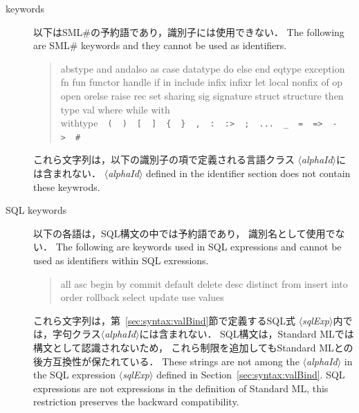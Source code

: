 \documentclass{jbook}
\newcommand{\txt}[2]{#2}
\newcommand{\smlsharp}{SML\#}
\newcommand{\nonterm}[1]{\mbox{$\langle$}{\it #1}\mbox{$\rangle$}}
\begin{document}
\begin{description}
\item[\txt{予約語}{keywords}] 
\ifjp%
	以下は\smlsharp{}の予約語であり，識別子には使用できない．
\else%
	The following are \smlsharp{} keywords and they cannot be used
as identifiers.
\fi%

\begin{tt}
\begin{quote}
abstype
and
andalso
as
case
datatype
do
else
end
eqtype
exception
fn
fun
functor
handle
if
in
include
infix
infixr
let
local
nonfix
of
op
open
orelse
raise
rec
set
sharing
sig
signature
struct
structure
then
type
val
where
while
with
withtype\ \
\verb|(|\ \
\verb|)|\ \
\verb([(\ \
\verb(](\ \
\verb({(\ \
\verb(}(\ \
\verb(,(\ \
\verb(:(\ \
\verb(:>(\ \
\verb(;(\ \
\verb(...(\ \
\verb(_(\ \
\verb(=(\ \
\verb(=>(\ \
\verb(->(\ \
\verb(#(
\end{quote}
\end{tt}

\ifjp%
	これら文字列は，以下の識別子の項で定義される言語クラス
\nonterm{alphaId}には含まれない．
\else%
	\nonterm{alphaId} defined in the identifier section does not contain
these keywrods.
\fi%

\item[\txt{SQL予約語}{SQL keywords}] 
\ifjp%
	以下の各語は，SQL構文の中では予約語であり，
識別名として使用でない．
\else%
	The following are keywords used in SQL expressions and cannot be
used as identifiers within SQL exressions.
\fi%

\begin{tt}
\begin{quote}
all
asc
begin
by
commit
default
delete
desc
distinct
from
insert
into
order
rollback
select
update
use
values
\end{quote}
\end{tt}

\ifjp%
	これら文字列は，第~\ref{sec:syntax:valBind}節で定義するSQL式
\nonterm{sqlExp}内では，字句クラス\nonterm{alphaId}には含まれない．
	SQL構文は，Standard MLでは構文として認識されないため，
これら制限を追加してもStandard MLとの後方互換性が保たれている．
\else%
	These strings are not among the \nonterm{alphaId} in 
the SQL expression \nonterm{sqlExp} defined in Section~\ref{sec:syntax:valBind}.
	SQL expressions are not expressions in the definition of
Standard ML, this restriction preserves the backward compatibility.
\fi%


\end{description}
\end{document}
